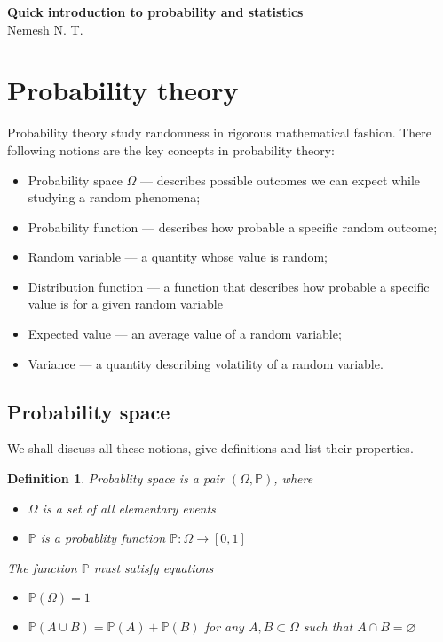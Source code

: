 \documentclass[12pt]{article}
\newtheorem{definition}[theorem]{Definition}
\begin{document}
\begin{center}

    \Large \textbf{Quick introduction to probability and statistics}\\[0.5cm]
    \small {Nemesh N. T.}\\[0.5cm]

\end{center}

\section{Probability theory}

Probability theory study randomness in rigorous mathematical fashion. There
following notions are the key concepts in probability theory:
\begin{itemize}
    \item Probability space $\Omega$ --- describes possible outcomes we can
          expect while studying a random phenomena;
    \item Probability function --- describes how probable a specific random
          outcome;
    \item Random variable --- a quantity whose value is random;
    \item Distribution function --- a function that describes how probable a
          specific value is for a given random variable
    \item Expected value --- an average value of a random variable;
    \item Variance --- a quantity describing volatility of a random variable.
\end{itemize}



\subsection{Probability space}

We shall discuss all these notions, give definitions and list their properties.

\begin{definition}
    Probablity space is a pair $(\Omega,\mathbb{P})$, where

    \begin{itemize}
        \item $\Omega$ is a set of all elementary events
        \item $\mathbb{P}$ is a probablity function $\mathbb{P}:\Omega\to [0,1]$
    \end{itemize}
    The function $\mathbb{P}$ must satisfy equations
    \begin{itemize}
        \item $\mathbb{P}(\Omega)=1$
        \item  $\mathbb{P}(A\cup B)=\mathbb{P}(A)+\mathbb{P}(B)$ for any
              $A,B\subset \Omega$ such that $A\cap B=\varnothing$
    \end{itemize}
\end{definition}
\end{document}
